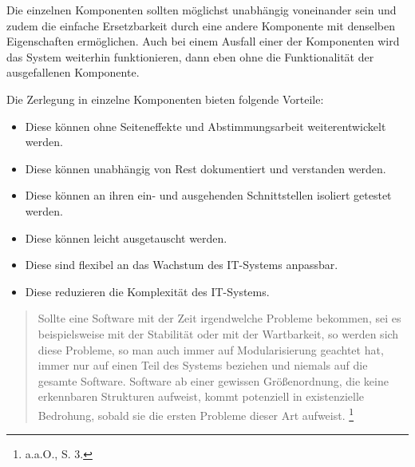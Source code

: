 Die einzelnen Komponenten sollten möglichst unabhängig voneinander sein und zudem die einfache Ersetzbarkeit durch eine andere Komponente mit denselben Eigenschaften ermöglichen. Auch bei einem Ausfall einer der Komponenten wird das System weiterhin funktionieren, dann eben ohne die Funktionalität der ausgefallenen Komponente.

Die Zerlegung in einzelne Komponenten bieten folgende Vorteile\autocite[Vgl.][3\psq]{gmodse}:
\begin{itemize}
\item Diese können ohne Seiteneffekte und Abstimmungsarbeit weiterentwickelt werden.
\item Diese können unabhängig von Rest dokumentiert und verstanden werden.
\item Diese können an ihren ein- und ausgehenden Schnittstellen isoliert getestet werden.
\item Diese können leicht ausgetauscht werden.
\item Diese sind flexibel an das Wachstum des \ac{IT}-Systems anpassbar.
\item Diese reduzieren die Komplexität des \ac{IT}-Systems.
\end{itemize}

\begin{quote}
\glqq{}Sollte eine Software mit der Zeit irgendwelche Probleme bekommen, sei es beispielsweise mit der Stabilität oder mit der Wartbarkeit, so werden sich diese Probleme, so man auch immer auf Modularisierung geachtet hat, immer nur auf einen Teil des Systems beziehen und niemals auf die gesamte Software. Software ab einer gewissen Größenordnung, die keine erkennbaren Strukturen aufweist, kommt potenziell in existenzielle Bedrohung, sobald sie die ersten Probleme dieser Art aufweist.\grqq{} \footnote{a.a.O., S. 3.}
\end{quote}

